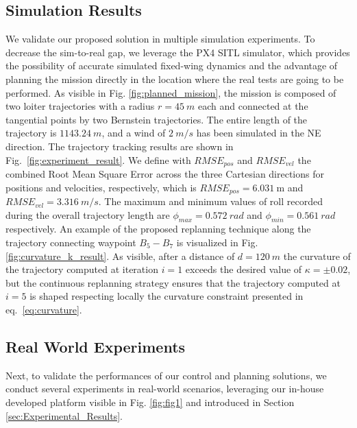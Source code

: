 
\subsection{Simulation Results}
\label{section:sim_results}
We validate our proposed solution in multiple simulation experiments. To decrease the sim-to-real gap, we leverage the PX4 SITL simulator, which provides the possibility of accurate simulated fixed-wing dynamics and the advantage of planning the mission directly in the location where the real tests are going to be performed. As visible in Fig. \ref{fig:planned_mission}, the mission is composed of two loiter trajectories with a radius $r = 45~\si{m}$ each and connected at the tangential points by two Bernstein trajectories. The entire length of the trajectory is $1143.24~\si{m}$, and a wind of $2~\si{m/s}$ has been simulated in the NE direction. 
The trajectory tracking results are shown in Fig.~\ref{fig:experiment_result}. We define with $RMSE_{pos}$ and $RMSE_{vel}$  the combined Root Mean Square Error across the three Cartesian directions for positions and velocities, respectively, which is $RMSE_{pos} = 6.031~\si{\meter}$ and $RMSE_{vel} = 3.316~\si{m/s}$. 
The maximum and minimum values of roll recorded during the overall trajectory length are $\phi_{max} = 0.572~\si{rad}$ and $\phi_{min} = 0.561~\si{rad}$ respectively.
An example of the proposed replanning technique along the trajectory connecting waypoint $B_5 - B_7$  is visualized in Fig. \ref{fig:curvature_k_result}. As visible, after a distance of $d = 120~\si{m}$ the curvature of the trajectory computed at iteration $i= 1$ exceeds the desired value of $\kappa=\pm 0.02$, but the continuous replanning strategy ensures that the trajectory computed at $i = 5$ is shaped respecting locally the curvature constraint presented in eq.~\eqref{eq:curvature}.

\subsection{Real World Experiments}
\label{section:rw_results}
Next, to validate the performances of our control and planning solutions, we conduct several experiments in real-world scenarios, leveraging our in-house developed platform visible in Fig. \ref{fig:fig1} and introduced in Section \ref{sec:Experimental_Results}.

